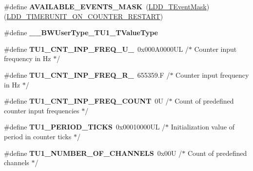 \begin{DoxyCompactItemize}
\item 
\#define {\bfseries A\+V\+A\+I\+L\+A\+B\+L\+E\+\_\+\+E\+V\+E\+N\+T\+S\+\_\+\+M\+A\+SK}~(\hyperlink{group___p_e___types__module_gafbe7f4d4e51560399c3bdd0218584533}{L\+D\+D\+\_\+\+T\+Event\+Mask})(\hyperlink{group___p_e___types__module_gae8e6bf9d76916611a08b76f20ceb1ef7}{L\+D\+D\+\_\+\+T\+I\+M\+E\+R\+U\+N\+I\+T\+\_\+\+O\+N\+\_\+\+C\+O\+U\+N\+T\+E\+R\+\_\+\+R\+E\+S\+T\+A\+RT})\hypertarget{group___t_u1__module_ga5f04a8830cd52a3ffa1678d113f31aee}{}\label{group___t_u1__module_ga5f04a8830cd52a3ffa1678d113f31aee}

\item 
\#define {\bfseries \+\_\+\+\_\+\+B\+W\+User\+Type\+\_\+\+T\+U1\+\_\+\+T\+Value\+Type}\hypertarget{group___t_u1__module_gaf0b58bf613a080724fc73a1d8b13ff39}{}\label{group___t_u1__module_gaf0b58bf613a080724fc73a1d8b13ff39}

\item 
\#define {\bfseries T\+U1\+\_\+\+C\+N\+T\+\_\+\+I\+N\+P\+\_\+\+F\+R\+E\+Q\+\_\+\+U\+\_}~0x000\+A0000\+U\+L /$\ast$ Counter input frequency in Hz $\ast$/\hypertarget{group___t_u1__module_ga85cc4897457440a2308166668f49da10}{}\label{group___t_u1__module_ga85cc4897457440a2308166668f49da10}

\item 
\#define {\bfseries T\+U1\+\_\+\+C\+N\+T\+\_\+\+I\+N\+P\+\_\+\+F\+R\+E\+Q\+\_\+\+R\+\_}~655359.\+F /$\ast$ Counter input frequency in Hz $\ast$/\hypertarget{group___t_u1__module_ga4913c95039859613c2db9d00795ab5d6}{}\label{group___t_u1__module_ga4913c95039859613c2db9d00795ab5d6}

\item 
\#define {\bfseries T\+U1\+\_\+\+C\+N\+T\+\_\+\+I\+N\+P\+\_\+\+F\+R\+E\+Q\+\_\+\+C\+O\+U\+NT}~0\+U      /$\ast$ Count of predefined counter input frequencies $\ast$/\hypertarget{group___t_u1__module_ga855f7e71146b18903d56643ec80c5ddb}{}\label{group___t_u1__module_ga855f7e71146b18903d56643ec80c5ddb}

\item 
\#define {\bfseries T\+U1\+\_\+\+P\+E\+R\+I\+O\+D\+\_\+\+T\+I\+C\+KS}~0x00010000\+U\+L /$\ast$ Initialization value of period in \textquotesingle{}counter ticks\textquotesingle{} $\ast$/\hypertarget{group___t_u1__module_ga17e6ec4b6bb1df9067daf9ac4204db66}{}\label{group___t_u1__module_ga17e6ec4b6bb1df9067daf9ac4204db66}

\item 
\#define {\bfseries T\+U1\+\_\+\+N\+U\+M\+B\+E\+R\+\_\+\+O\+F\+\_\+\+C\+H\+A\+N\+N\+E\+LS}~0x00\+U   /$\ast$ Count of predefined channels $\ast$/\hypertarget{group___t_u1__module_ga15dbabf955f2e2b0f888b98320eabfa3}{}\label{group___t_u1__module_ga15dbabf955f2e2b0f888b98320eabfa3}


\end{DoxyCompactItemize}
